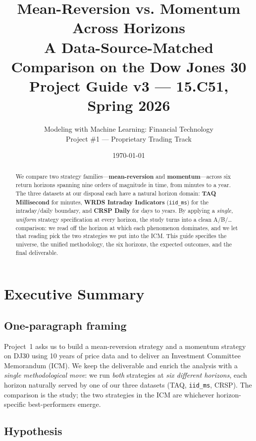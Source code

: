 \documentclass[11pt,letterpaper]{article}
\title{\vspace{-1.5cm}\color{mitred}\textbf{Mean-Reversion vs. Momentum Across Horizons}\\[0.3em]
\Large\color{accent}A Data-Source-Matched Comparison on the Dow Jones 30 \\[0.6em]
\large\color{black}\normalfont Project Guide v3 --- 15.C51, Spring 2026}
\author{Modeling with Machine Learning: Financial Technology\\Project \#1 --- Proprietary Trading Track}
\date{\today}
\begin{document}
\maketitle
\thispagestyle{empty}

\begin{abstract}
\noindent We compare two strategy families---\textbf{mean-reversion} and \textbf{momentum}---across six return horizons spanning nine orders of magnitude in time, from minutes to a year. The three datasets at our disposal each have a natural horizon domain: \textbf{TAQ Millisecond} for minutes, \textbf{WRDS Intraday Indicators} (\texttt{iid\_ms}) for the intraday/daily boundary, and \textbf{CRSP Daily} for days to years. By applying a \emph{single, uniform} strategy specification at every horizon, the study turns into a clean A/B/\dots{} comparison: we read off the horizon at which each phenomenon dominates, and we let that reading pick the two strategies we put into the ICM. This guide specifies the universe, the unified methodology, the six horizons, the expected outcomes, and the final deliverable.
\end{abstract}

\tableofcontents
\newpage

\section{Executive Summary}\label{sec:summary}

\subsection{One-paragraph framing}

Project~1 asks us to build a mean-reversion strategy and a momentum strategy on DJ30 using 10 years of price data and to deliver an Investment Committee Memorandum (ICM). We keep the deliverable and enrich the analysis with a \emph{single methodological move}: we run \emph{both} strategies at \emph{six different horizons}, each horizon naturally served by one of our three datasets (TAQ, \texttt{iid\_ms}, CRSP). The comparison is the study; the two strategies in the ICM are whichever horizon-specific best-performers emerge.

\subsection{Hypothesis}
\end{document}
